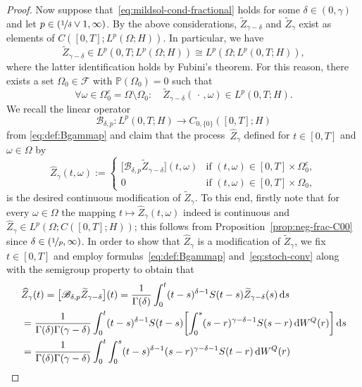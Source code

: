 \documentclass[reqno]{amsart}
\numberwithin{equation}{section}
\newcommand{\bbP}{\mathbb{P}}
\newcommand{\cF}{\mathcal{F}}
\newcommand{\rd}{\mathop{}\!\mathrm{d}}
\newcommand{\from}{\colon}
\theoremstyle{remark}
\theoremstyle{definition}
\begin{document}
\begin{proof}
	Now suppose that~\eqref{eq:mildsol-cond-fractional}
	holds for some $\delta \in (0,\gamma)$ 
	and let $p\in( \nicefrac{1}{\delta} \vee 1, \infty)$. 
	By the above considerations,
	$\widetilde Z_{\gamma-\delta}$ and $\widetilde Z_{\gamma}$ exist
	as elements of $C([0,T];L^p(\Omega;H))$. 
	In particular, we have
	\[
		\widetilde Z_{\gamma-\delta} \in L^p(0,T; L^p(\Omega; H)) \cong L^p(\Omega; L^p(0,T;H)),
	\]
	where the latter identification holds by Fubini's theorem. 
	For this reason, there exists a set 
	$\Omega_0\in\cF$ 
	with $\bbP(\Omega_0)=0$ 
	such that 
	\[
		\forall\omega \in \Omega_0^c = \Omega\setminus\Omega_0 : \quad 
		\widetilde Z_{\gamma-\delta} (\,\cdot\,, \omega) 
		\in L^p(0,T;H).
	\]
	We recall the linear operator 
	\[
		\mathscr{B}_{\delta,p} \from L^p(0,T;H) \to C_{0,\{0\}}([0,T];H)
	\]
	from \eqref{eq:def:Bgammap} and 
	claim that the process~$\widehat{Z}_\gamma$ 
	defined for $t\in[0,T]$ and $\omega\in\Omega$ by  
	\[
	\widehat{Z}_\gamma(t, \omega) 
	:= 
	\begin{cases} 
	\bigl[\mathscr{B}_{\delta,p} 
	\widetilde Z_{\gamma-\delta}\bigr](t, \omega) 
	&\text{if }(t,\omega) \in [0,T]\times \Omega_0^c , 
	\\
	0 
	&\text{if }(t,\omega) \in [0,T]\times \Omega_0 , 
	\end{cases} 
	\]
	is
	the desired continuous modification of $\widetilde Z_\gamma$.
	To this end, firstly note that for every $\omega\in\Omega$ 
	the mapping $t \mapsto \widehat{Z}_\gamma(t, \omega)$ 
	indeed is continuous and  
	$\widehat{Z}_\gamma\in L^p(\Omega; C([0,T];H))$; 
	this follows 
	from Proposition~\ref{prop:neg-frac-C00} since 
	$\delta \in( \nicefrac{1}{p}, \infty)$. 
	In order to show that $\widehat{Z}_\gamma$ 
	is a modification of $\widetilde{Z}_\gamma$, 
	we fix $t \in [0,T]$ and employ formulas~\eqref{eq:def:Bgammap}
	and~\eqref{eq:stoch-conv} along with the semigroup property to obtain that 
	\begin{align}
	&\widehat{Z}_{\gamma}(t)
	= 
	\bigl[\mathscr{B}_{\delta,p} 
	\widetilde Z_{\gamma-\delta}\bigr](t) 
	= 
	\frac{1}{\Gamma(\delta)} 
	\int_0^t (t-s)^{\delta-1} S(t-s) \widetilde Z_{\gamma-\delta}(s) 
	\rd s
	\notag
	\\
	&= 
	\frac{1}{\Gamma(\delta)\Gamma(\gamma-\delta)} 
	\int_0^t 
	(t-s)^{\delta-1} S(t-s) 
	\biggl[
	\int_0^s (s-r)^{\gamma-\delta-1}S(s-r)\rd W^Q(r)
	\biggr]
	\rd s 
	\notag
	\\
	&= 
	\frac{1}{\Gamma(\delta)\Gamma(\gamma-\delta)} 
	\int_0^t \int_0^s
	(t-s)^{\delta-1} 
	(s-r)^{\gamma-\delta-1} S(t-r) \rd W^Q(r)

\end{align}
\end{proof}
\end{document}
